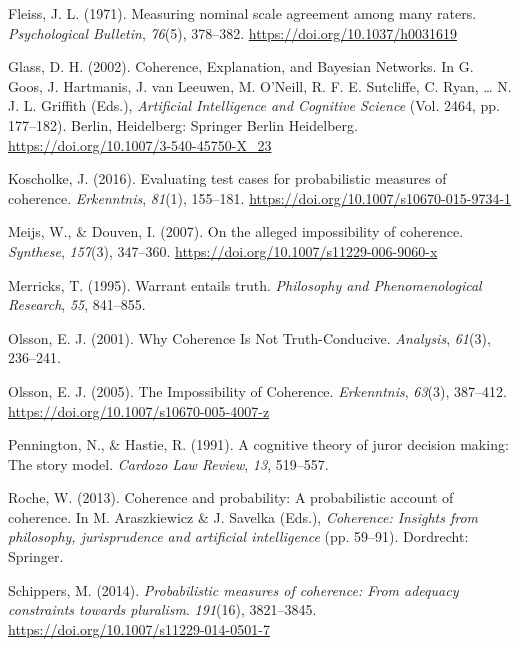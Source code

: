 \documentclass[
  10pt,
]{scrartcl}
\newlength{\cslhangindent}
\newlength{\cslentryspacingunit} %
\newenvironment{CSLReferences}[2] %
 {%
  \setlength{\parindent}{0pt}
  \ifodd #1
  \let\oldpar\par
  \def\par{\hangindent=\cslhangindent\oldpar}
  \fi
  \setlength{\parskip}{#2\cslentryspacingunit}
 }%
 {}
\begin{document}
\begin{CSLReferences}{1}{0}
\leavevmode{}%
Fleiss, J. L. (1971). Measuring nominal scale agreement among many raters. \emph{Psychological Bulletin}, \emph{76}(5), 378--382. \url{https://doi.org/10.1037/h0031619}

\leavevmode{}%
Glass, D. H. (2002). Coherence, {Explanation}, and {Bayesian Networks}. In G. Goos, J. Hartmanis, J. van Leeuwen, M. O'Neill, R. F. E. Sutcliffe, C. Ryan, \ldots{} N. J. L. Griffith (Eds.), \emph{Artificial {Intelligence} and {Cognitive Science}} (Vol. 2464, pp. 177--182). {Berlin, Heidelberg}: {Springer Berlin Heidelberg}. \url{https://doi.org/10.1007/3-540-45750-X_23}

\leavevmode{}%
Koscholke, J. (2016). Evaluating test cases for probabilistic measures of coherence. \emph{Erkenntnis}, \emph{81}(1), 155--181. \url{https://doi.org/10.1007/s10670-015-9734-1}

\leavevmode{}%
Meijs, W., \& Douven, I. (2007). On the alleged impossibility of coherence. \emph{Synthese}, \emph{157}(3), 347--360. \url{https://doi.org/10.1007/s11229-006-9060-x}

\leavevmode{}%
Merricks, T. (1995). Warrant entails truth. \emph{Philosophy and Phenomenological Research}, \emph{55}, 841--855.

\leavevmode{}%
Olsson, E. J. (2001). Why {Coherence Is Not Truth}-{Conducive}. \emph{Analysis}, \emph{61}(3), 236--241.

\leavevmode{}%
Olsson, E. J. (2005). The {Impossibility} of {Coherence}. \emph{Erkenntnis}, \emph{63}(3), 387--412. \url{https://doi.org/10.1007/s10670-005-4007-z}

\leavevmode{}%
Pennington, N., \& Hastie, R. (1991). A cognitive theory of juror decision making: The story model. \emph{Cardozo Law Review}, \emph{13}, 519--557.

\leavevmode{}%
Roche, W. (2013). Coherence and probability: A probabilistic account of coherence. In M. Araszkiewicz \& J. Savelka (Eds.), \emph{Coherence: Insights from philosophy, jurisprudence and artificial intelligence} (pp. 59--91). Dordrecht: Springer.

\leavevmode{}%
Schippers, M. (2014). \emph{Probabilistic measures of coherence: From adequacy constraints towards pluralism}. \emph{191}(16), 3821--3845. \url{https://doi.org/10.1007/s11229-014-0501-7}


\end{CSLReferences}
\end{document}
